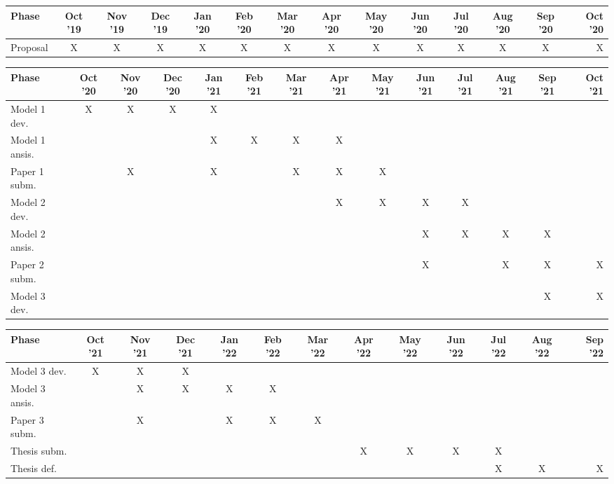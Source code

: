 \documentclass{article}
\begin{document}
\begin{sidewaystable}[ht!]
\centering
{}
\begin{tabular}{ l*{12}{c}r } 
 \hline
 Phase & Oct '19 & Nov '19 & Dec '19 & Jan '20 & Feb '20 & Mar '20 & Apr '20 & May '20 & Jun '20 & Jul '20 & Aug '20 & Sep '20 & Oct '20 \\
 \hline
 Proposal & X & X & X & X & X & X & X & X & X & X & X & X & X \\
 \hline
\end{tabular}
\hspace{\parskip}
\begin{tabular}{ l*{12}{c}r  } 
 \hline
 Phase & Oct '20 & Nov '20 & Dec '20 & Jan '21 & Feb '21 & Mar '21 & Apr '21 & May '21 & Jun '21 & Jul '21 & Aug '21 & Sep '21 & Oct '21 \\
 \hline
 Model 1 dev. & X & X & X & X & & & & & & & & & \\
 Model 1 ansis. &  &  &  & X & X & X & X & & & & & & \\
 Paper 1 subm. &  & X &  & X & & X & X & X & & & & & \\
 Model 2 dev. & & & & & & & X & X & X & X & & & \\
 Model 2 ansis. &  & & & & & & & & X & X & X & X & \\
 Paper 2 subm. & & & & & & & & & X & & X & X & X \\
 Model 3 dev. & & & & & & & & & & & & X & X \\
 \hline
\end{tabular}
\hspace{\parskip}
\begin{tabular}{ l*{11}{c}r  } 
 \hline
 Phase & Oct '21 & Nov '21 & Dec '21 & Jan '22 & Feb '22 & Mar '22 & Apr '22 & May '22 & Jun '22 & Jul '22 & Aug '22 & Sep '22\\
 \hline
 Model 3 dev. & X & X & X & & & & & & & & & \\
 Model 3 ansis. &  & X & X & X & X & & & & & & & \\
 Paper 3 subm. &  & X &  & X & X & X & & & & & & \\
 Thesis subm. & & & & & & & X & X & X & X & & \\
 Thesis def. &  & & & & & & & & & X & X & X \\
 \hline
\end{tabular}
\end{sidewaystable}

\clearpage



\end{document}
